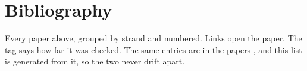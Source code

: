 \documentclass[10pt]{article}
\begin{document}
\clearpage
\section{Bibliography}
Every paper above, grouped by strand and numbered. Links open the paper. The tag says how far it was checked.
The same entries are in the paper\textquotesingle s , and this list is generated from
it, so the two never drift apart.

\end{document}
